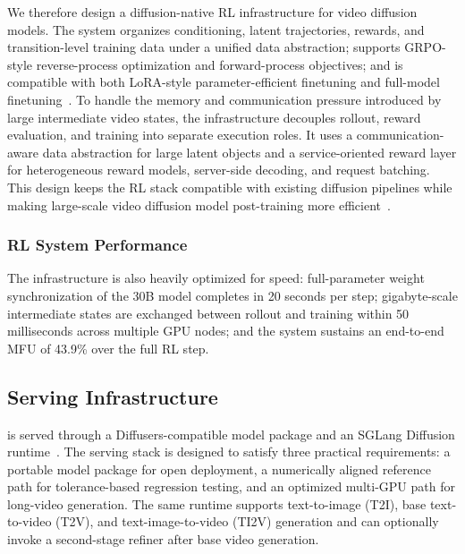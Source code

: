 \noindent We therefore design a diffusion-native RL infrastructure for video diffusion models.
The system organizes conditioning, latent trajectories, rewards, and transition-level training data under a unified data abstraction; supports GRPO-style reverse-process optimization and forward-process objectives; and is compatible with both LoRA-style parameter-efficient finetuning and full-model finetuning~\cite{hu2021lora}.
To handle the memory and communication pressure introduced by large intermediate video states, the infrastructure decouples rollout, reward evaluation, and training into separate execution roles.
It uses a communication-aware data abstraction for large latent objects and a service-oriented reward layer for heterogeneous reward models, server-side decoding, and request batching.
This design keeps the RL stack compatible with existing diffusion pipelines while making large-scale video diffusion model post-training more efficient~\cite{
    von-platen-etal-2022-diffusers,
    moritz2018ray}.

\subsubsection{RL System Performance}

\noindent The infrastructure is also heavily optimized for speed: full-parameter weight synchronization of the 30B model completes in 20 seconds per step; gigabyte-scale intermediate states are exchanged between rollout and training within 50 milliseconds across multiple GPU nodes; and the system sustains an end-to-end MFU of 43.9\% over the full RL step.

\subsection{Serving Infrastructure}
\method is served through a Diffusers-compatible model package and an SGLang Diffusion runtime~\cite{von-platen-etal-2022-diffusers,zheng2024sglang}.
The serving stack is designed to satisfy three practical requirements: a portable model package for open deployment, a numerically aligned reference path for tolerance-based regression testing, and an optimized multi-GPU path for long-video generation.
The same runtime supports text-to-image (T2I), base text-to-video (T2V), and text-image-to-video (TI2V) generation and can optionally invoke a second-stage refiner after base video generation.

